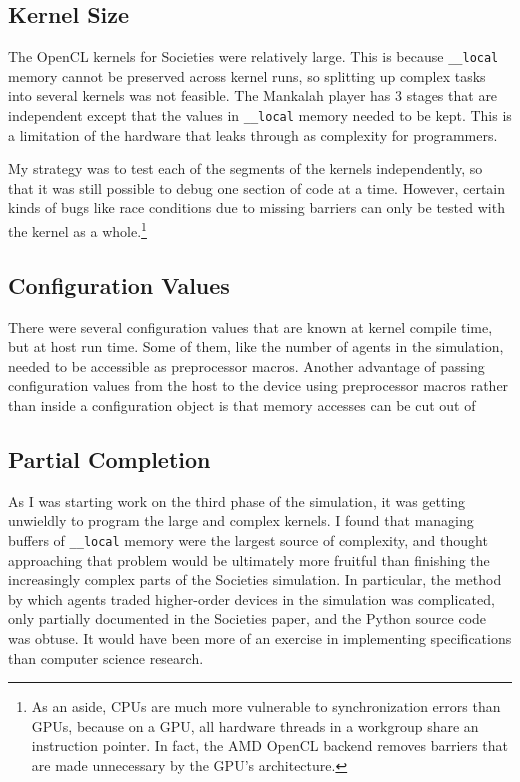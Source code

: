 \documentclass{article}
\begin{document}
\subsection{Kernel Size}
The OpenCL kernels for Societies were relatively large. This is because \texttt{\_\_local} memory cannot be preserved across kernel runs, so splitting up complex tasks into several kernels was not feasible. The Mankalah player has 3 stages that are independent except that the values in \texttt{\_\_local} memory needed to be kept. This is a limitation of the hardware that leaks through as complexity for programmers.

My strategy was to test each of the segments of the kernels independently, so that it was still possible to debug one section of code at a time. However, certain kinds of bugs like race conditions due to missing barriers can only be tested with the kernel as a whole.\footnote{As an aside, CPUs are much more vulnerable to synchronization errors than GPUs, because on a GPU, all hardware threads in a workgroup share an instruction pointer. In fact, the AMD OpenCL backend removes barriers that are made unnecessary by the GPU's architecture.}

\subsection{Configuration Values}
There were several configuration values that are known at kernel compile time, but at host run time. Some of them, like the number of agents in the simulation, needed to be accessible as preprocessor macros. Another advantage of passing configuration values from the host to the device using preprocessor macros rather than inside a configuration object is that memory accesses can be cut out of 

\subsection{Partial Completion}
As I was starting work on the third phase of the simulation, it was getting unwieldly to program the large and complex kernels. I found that managing buffers of \texttt{\_\_local} memory were the largest source of complexity, and thought approaching that problem would be ultimately more fruitful than finishing the increasingly complex parts of the Societies simulation. In particular, the method by which agents traded higher-order devices in the simulation was complicated, only partially documented in the Societies paper, and the Python source code was obtuse. It would have been more of an exercise in implementing specifications than computer science research.
\end{document}
